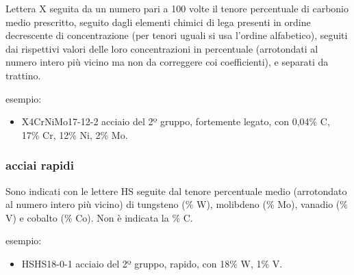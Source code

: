 Lettera X seguita da un numero pari a 100 volte il tenore percentuale di carbonio medio prescritto, seguito dagli elementi chimici di lega presenti in ordine decrescente di concentrazione (per tenori uguali si usa l'ordine alfabetico), seguiti dai rispettivi valori delle loro concentrazioni in percentuale (arrotondati al numero intero più vicino ma non da correggere coi coefficienti), e separati da trattino.

esempio:
\begin{itemize}
    \item X4CrNiMo17-12-2 acciaio del 2º gruppo, fortemente legato, con 0,04\% C, 17\% Cr, 12\% Ni, 2\% Mo.
\end{itemize}

\subsubsection{acciai rapidi}

Sono indicati con le lettere HS seguite dal tenore percentuale medio (arrotondato al numero intero più vicino) di tungsteno (\% W), molibdeno (\% Mo), vanadio (\% V) e cobalto (\% Co). Non è indicata la \% C.

esempio:
\begin{itemize}
    \item HSHS18-0-1 acciaio del 2º gruppo, rapido, con 18\% W, 1\% V.
\end{itemize}